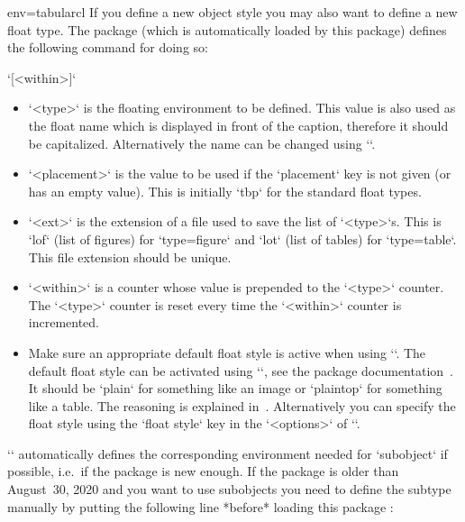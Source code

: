 \begin{tableobject}{env=tabular}{cl}
If you define a new object style you may also want to define a new float type.
The  package (which is automatically loaded by this package) defines the following command for doing so:

\DescribeMacro{\newfloat}
`[<within>]`
\begin{itemize}
\item `<type>` is the floating environment to be defined.
  This value is also used as the float name which is displayed in front of the caption, therefore it should be capitalized.
  Alternatively the name can be changed using ``.
\item `<placement>` is the value to be used if the `placement` key is not given (or has an empty value).
  This is initially `tbp` for the standard float types.
\item `<ext>` is the extension of a file used to save the list of `<type>`s.
  This is `lof` (list of figures) for `type=figure` and `lot` (list of tables) for `type=table`.
  This file extension should be unique.
\item `<within>` is a counter whose value is prepended to the `<type>` counter. The `<type>` counter is reset every time the `<within>` counter is incremented.
\item Make sure an appropriate default float style is active when using `\newfloat`.
  The default float style can be activated using ``, see the  package documentation~\autocite{float}.
  It should be `plain` for something like an image or `plaintop` for something like a table.
  The reasoning is explained in~\autocite{texexchange_caption_position}.
  Alternatively you can specify the float style using the `float style` key in the `<options>` of `\NewObjectStyle`.
\end{itemize}

`\NewObjectStyle` automatically defines the corresponding environment needed for `subobject` if possible, i.e.\ if the  package is new enough.
If the  package is older than August~30, 2020 and you want to use subobjects you need to define the subtype manually by putting the following line *before* loading this package \autocite{texexchange_subtype_workaround}:
\begin{examplecode}
\end{examplecode}


\end{tableobject}
